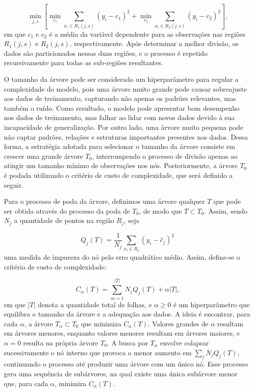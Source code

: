 \documentclass[
  12pt,
  a4paper,
]{scrreprt}
\begin{document}
\[
\min_{j, s}\left[\min_{c_1} \sum_{x_i \in R_1\left(j, s\right)} \left(y_i - c_{1}\right)^2 + \min_{c_2} \sum_{x_i \in R_2\left(j, s\right)} \left(y_i - c_{2}\right)^2\right]\text{,}
\] em que \(c_1\) e \(c_2\) é a média da variável dependente para as
observações nas regiões \(R_1\left(j, s\right)\) e
\(R_2\left(j, s\right)\), respectivamente. Após determinar a melhor
divisão, os dados são particionados nessas duas regiões, e o processo é
repetido recursivamente para todas as sub-regiões resultantes.

\vspace{12pt}

O tamanho da árvore pode ser considerado um hiperparâmetro para regular
a complexidade do modelo, pois uma árvore muito grande pode causar
sobreajuste aos dados de treinamento, capturando não apenas os padrões
relevantes, mas também o ruído. Como resultado, o modelo pode apresentar
bom desempenho nos dados de treinamento, mas falhar ao lidar com novos
dados devido à sua incapacidade de generalização. Por outro lado, uma
árvore muito pequena pode não captar padrões, relações e estruturas
importantes presentes nos dados. Dessa forma, a estratégia adotada para
selecionar o tamanho da árvore consiste em crescer uma grande árvore
\(T_0\), interrompendo o processo de divisão apenas ao atingir um
tamanho mínimo de observações nos nós. Posteriormente, a árvore \(T_0\)
é podada utilizando o critério de custo de complexidade, que será
definido a seguir.

\vspace{12pt}

Para o processo de poda da árvore, definimos uma árvore qualquer \(T\)
que pode ser obtida através do processo da poda de \(T_0\), de modo que
\(T \subset T_0\). Assim, sendo \(N_j\) a quantidade de pontos na região
\(R_j\), seja

\[
Q_j\left(T\right) = \frac{1}{N_j} \sum_{x_i \in R_j}\left(y_i - \hat{c}_j\right)^2
\] uma medida de impureza do nó pelo erro quadrático médio. Assim,
define-se o critério de custo de complexidade:

\[
C_{\alpha}\left(T\right) = \sum_{m = 1}^{|T|}N_jQ_j\left(T\right) + \alpha |T|\text{,}
\] em que \(|T|\) denota a quantidade total de folhas, e
\(\alpha \geq 0\) é um hiperparâmetro que equilibra o tamanho da árvore
e a adequação aos dados. A ideia é encontrar, para cada \(\alpha\), a
árvore \(T_{\alpha} \subset T_0\) que minimiza
\(C_{\alpha}\left(T\right)\). Valores grandes de \(\alpha\) resultam em
árvores menores, enquanto valores menores resultam em árvores maiores, e
\(\alpha = 0\) resulta na própria árvore \(T_0\). A busca por
\(T_{\alpha}\) envolve colapsar sucessivamente o nó interno que provoca
o menor aumento em \(\sum_j N_j Q_j\left(T\right)\), continuando o
processo até produzir uma árvore com um único nó. Esse processo gera uma
sequência de subárvores, na qual existe uma única subárvore menor que,
para cada \(\alpha\), minimiza \(C_{\alpha}\left(T\right)\).
\end{document}
